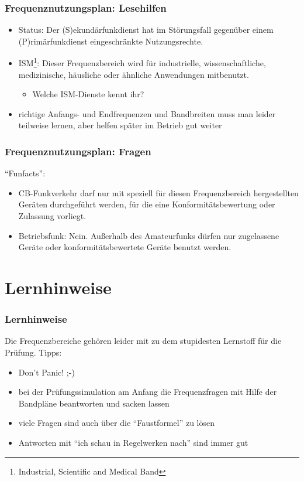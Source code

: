 \begin{frame}
  \frametitle{Frequenznutzungsplan: Lesehilfen}

  \begin{itemize}[<+->]
    \item Status: Der (S)ekundärfunkdienst hat im Störungsfall gegenüber einem
      (P)rimärfunkdienst eingeschränkte Nutzungsrechte.
    \item ISM\footnote{Industrial, Scientific and Medical Band}: Dieser
      Frequenzbereich wird für industrielle, wissenschaftliche,
      medizinische, häusliche oder ähnliche Anwendungen mitbenutzt.
      \begin{itemize}
        \item Welche ISM-Dienste kennt ihr?
      \end{itemize}
    \item richtige Anfangs- und Endfrequenzen und Bandbreiten muss man
      leider teilweise lernen, aber helfen später im Betrieb gut weiter
  \end{itemize}

\end{frame}

\begin{frame}
  \frametitle{Frequenznutzungsplan: Fragen}

  ``Funfacts'':

  \begin{itemize}
    \item CB-Funkverkehr darf nur mit speziell für diesen Frequenzbereich
      hergestellten Geräten durchgeführt werden, für die eine
      Konformitätsbewertung oder Zulassung vorliegt.
    \item Betriebsfunk: Nein. Außerhalb des Amateurfunks dürfen nur zugelassene Geräte oder
      konformitätsbewertete Geräte benutzt werden.
  \end{itemize}

\end{frame}

\section{Lernhinweise}

\begin{frame}
  \frametitle{Lernhinweise}

  Die Frequenzbereiche gehören leider mit zu dem stupidesten Lernstoff für die
  Prüfung. Tipps:

  \begin{itemize}
    \item Don't Panic! ;-)
    \item bei der Prüfungssimulation am Anfang die Frequenzfragen mit Hilfe
      der Bandpläne beantworten und sacken lassen
    \item viele Fragen sind auch über die ``Faustformel'' zu lösen
    \item Antworten mit ``ich schau in Regelwerken nach'' sind immer gut
  \end{itemize}

\end{frame}


